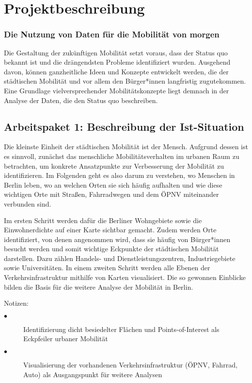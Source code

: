 \newpage
\section{Projektbeschreibung} \label{projektbeschreibung}

\subsubsection{Die Nutzung von Daten für die Mobilität von morgen}

Die Gestaltung der zukünftigen Mobilität setzt voraus, dass der Status quo bekannt ist und die drängendsten Probleme identifiziert wurden. Ausgehend davon, können ganzheitliche Ideen und Konzepte entwickelt werden, die der städtischen Mobilität und vor allem den Bürger*innen langfristig zugutekommen. Eine Grundlage vielversprechender Mobilitätskonzepte liegt demnach in der Analyse der Daten, die den Status quo beschreiben.


\subsection{Arbeitspaket 1: Beschreibung der Ist-Situation}

Die kleinste Einheit der städtischen Mobilität ist der Mensch. Aufgrund dessen ist es sinnvoll, zunächst das menschliche Mobilitätsverhalten im urbanen Raum zu betrachten, um konkrete Ansatzpunkte zur Verbesserung der Mobilität zu identifizieren. Im Folgenden geht es also darum zu verstehen, wo Menschen in Berlin leben, wo an welchen Orten sie sich häufig aufhalten und wie diese wichtigen Orte mit Straßen, Fahrradwegen und dem ÖPNV miteinander verbunden sind.

Im ersten Schritt werden dafür die Berliner Wohngebiete sowie die Einwohnerdichte auf einer Karte sichtbar gemacht. Zudem werden Orte identifiziert, von denen angenommen wird, dass sie häufig von Bürger*innen besucht werden und somit wichtige Eckpunkte der städtischen Mobilität darstellen. Dazu zählen Handels- und Dienstleistungszentren, Industriegebiete sowie Universitäten. In einem zweiten Schritt werden alle Ebenen der Verkehrsinfrastruktur mithilfe von Karten visualisiert. Die so gewonnen Einblicke bilden die Basis für die weitere Analyse der Mobilität in Berlin.

Notizen:
\begin{description}
    \item[$\bullet$] Identifizierung dicht besiedelter Flächen und Points-of-Interest als Eckpfeiler urbaner Mobilität
    \item[$\bullet$] Visualisierung der vorhandenen Verkehrsinfrastruktur (ÖPNV, Fahrrad, Auto) als Ausgangspunkt für weitere Analysen
  \end{description}

